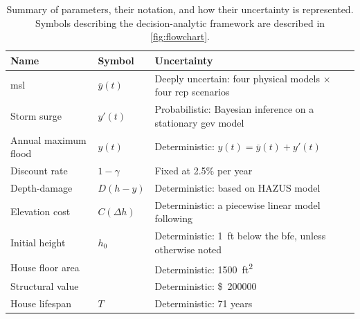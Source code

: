 \documentclass[11pt]{article}
\newcommand{\usd}[1]{\SI{#1}[\$]{}}
\begin{document}
\begin{table}
    \centering
    \caption{
        Summary of parameters, their notation, and how their uncertainty is represented.
        Symbols describing the decision-analytic framework are described in \cref{fig:flowchart}.
    }\label{tab:uncertainties}
    \footnotesize
    \begin{tabular}{p{1.25in} p{0.75in} p{3in}}
        \toprule
        Name                 & Symbol            & Uncertainty                                                                          \\
        \midrule
        \Gls{msl}            & $\overline{y}(t)$ & Deeply uncertain: four physical models $\times$ four \acrshort{rcp} scenarios        \\
        Storm surge          & $y'(t)$           & Probabilistic: Bayesian inference on a stationary \acrshort{gev} model               \\
        Annual maximum flood & $y(t)$            & Deterministic: $y(t)=\overline{y}(t)+y'(t)$                                          \\
        Discount rate        & $1-\gamma$        & Fixed at 2.5\% per year                                                              \\
        Depth-damage         & $D(h-y)$          & Deterministic: based on HAZUS model \citep[see][]{zarekarizi_suboptimal:2020}        \\
        Elevation cost       & $C(\Delta h)$     & Deterministic: a piecewise linear model following \citet{zarekarizi_suboptimal:2020} \\
        Initial height       & $h_0$             & Deterministic: \SI{1}{ft} below the \gls{bfe}, unless otherwise noted                \\
        House floor area     &                   & Deterministic: \SI{1500}{ft^2}                                                       \\
        Structural value     &                   & Deterministic: \usd{200000}                                                          \\
        House lifespan       & $T$               & Deterministic: 71 years                                                              \\
        \bottomrule
    \end{tabular}
\end{table}
\end{document}
